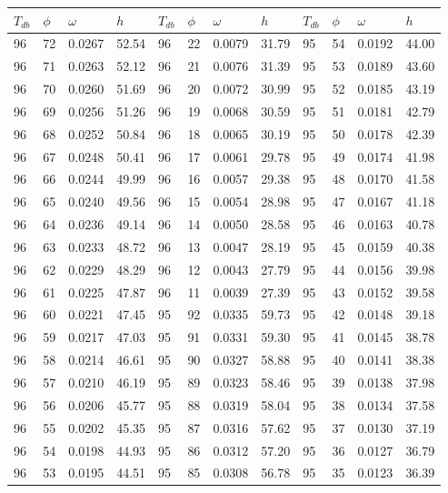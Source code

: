 \begin{tabular}{llll|llll|llll}
 \toprule 
\(T_{db}\) & \(\phi\) & \(\omega\) & \(h\) & \(T_{db}\) & \(\phi\) & \(\omega\) & \(h\) & \(T_{db}\) & \(\phi\) & \(\omega\) & \(h\)  \\ \midrule 
96 & 72 & 0.0267 & 52.54 & 96 & 22 & 0.0079 & 31.79 & 95 & 54 & 0.0192 & 44.00\\
96 & 71 & 0.0263 & 52.12 & 96 & 21 & 0.0076 & 31.39 & 95 & 53 & 0.0189 & 43.60\\
96 & 70 & 0.0260 & 51.69 & 96 & 20 & 0.0072 & 30.99 & 95 & 52 & 0.0185 & 43.19\\
96 & 69 & 0.0256 & 51.26 & 96 & 19 & 0.0068 & 30.59 & 95 & 51 & 0.0181 & 42.79\\
96 & 68 & 0.0252 & 50.84 & 96 & 18 & 0.0065 & 30.19 & 95 & 50 & 0.0178 & 42.39\\
96 & 67 & 0.0248 & 50.41 & 96 & 17 & 0.0061 & 29.78 & 95 & 49 & 0.0174 & 41.98\\
96 & 66 & 0.0244 & 49.99 & 96 & 16 & 0.0057 & 29.38 & 95 & 48 & 0.0170 & 41.58\\
96 & 65 & 0.0240 & 49.56 & 96 & 15 & 0.0054 & 28.98 & 95 & 47 & 0.0167 & 41.18\\
96 & 64 & 0.0236 & 49.14 & 96 & 14 & 0.0050 & 28.58 & 95 & 46 & 0.0163 & 40.78\\
96 & 63 & 0.0233 & 48.72 & 96 & 13 & 0.0047 & 28.19 & 95 & 45 & 0.0159 & 40.38\\
96 & 62 & 0.0229 & 48.29 & 96 & 12 & 0.0043 & 27.79 & 95 & 44 & 0.0156 & 39.98\\
96 & 61 & 0.0225 & 47.87 & 96 & 11 & 0.0039 & 27.39 & 95 & 43 & 0.0152 & 39.58\\
96 & 60 & 0.0221 & 47.45 & 95 & 92 & 0.0335 & 59.73 & 95 & 42 & 0.0148 & 39.18\\
96 & 59 & 0.0217 & 47.03 & 95 & 91 & 0.0331 & 59.30 & 95 & 41 & 0.0145 & 38.78\\
96 & 58 & 0.0214 & 46.61 & 95 & 90 & 0.0327 & 58.88 & 95 & 40 & 0.0141 & 38.38\\
96 & 57 & 0.0210 & 46.19 & 95 & 89 & 0.0323 & 58.46 & 95 & 39 & 0.0138 & 37.98\\
96 & 56 & 0.0206 & 45.77 & 95 & 88 & 0.0319 & 58.04 & 95 & 38 & 0.0134 & 37.58\\
96 & 55 & 0.0202 & 45.35 & 95 & 87 & 0.0316 & 57.62 & 95 & 37 & 0.0130 & 37.19\\
96 & 54 & 0.0198 & 44.93 & 95 & 86 & 0.0312 & 57.20 & 95 & 36 & 0.0127 & 36.79\\
96 & 53 & 0.0195 & 44.51 & 95 & 85 & 0.0308 & 56.78 & 95 & 35 & 0.0123 & 36.39\\

\end{tabular}
